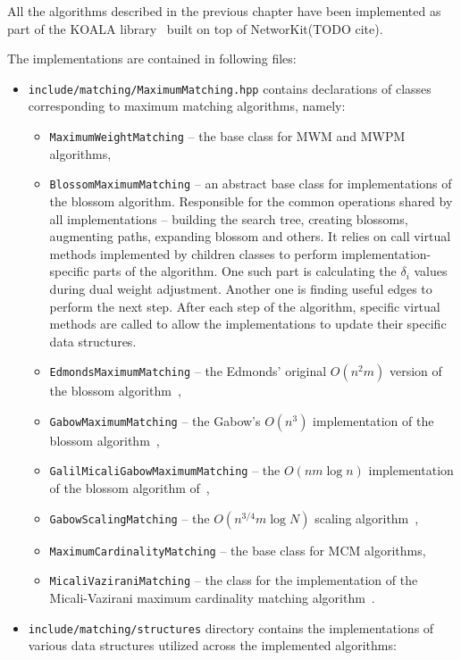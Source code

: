 All the algorithms described in the previous chapter have been implemented as part of the KOALA library~\cite{koala-networkit} built on top of NetworKit(TODO cite). 

The implementations are contained in following files:

\begin{itemize}
    \item \texttt{include/matching/MaximumMatching.hpp} contains declarations of classes corresponding to maximum matching algorithms, namely: \begin{itemize}
        \item \texttt{MaximumWeightMatching} – the base class for \textsc{MWM} and \textsc{MWPM} algorithms,
        \item \texttt{BlossomMaximumMatching} – an abstract base class for implementations of the blossom algorithm. Responsible for the common operations shared by all implementations – building the search tree, creating blossoms, augmenting paths, expanding blossom and others. It relies on call virtual methods implemented by children classes to perform implementation-specific parts of the algorithm. One such part is calculating the $\delta_i$ values during dual weight adjustment. Another one is finding useful edges to perform the next step. After each step of the algorithm, specific virtual methods are called to allow the implementations to update their specific data structures.
        \item \texttt{EdmondsMaximumMatching} – the Edmonds' original $O(n^2m)$ version of the blossom algorithm~\cite{edmonds1965maximum},
        \item \texttt{GabowMaximumMatching} – the Gabow's $O(n^3)$ implementation of the blossom algorithm~\cite{gabow1974implementation},
        \item \texttt{GalilMicaliGabowMaximumMatching} – the $O(nm\log n)$ implementation of the blossom algorithm of~\cite{galil1986ev},
        \item \texttt{GabowScalingMatching} – the $O(n^{3/4}m\log N)$ scaling algorithm~\cite{gabow1984scaling},
        \item \texttt{MaximumCardinalityMatching} – the base class for \textsc{MCM} algorithms,
        \item \texttt{MicaliVaziraniMatching} – the class for the implementation of the Micali-Vazirani maximum cardinality matching algorithm~\cite{micali1980v}.
    \end{itemize}
    \item \texttt{include/matching/structures} directory contains the implementations of various data structures utilized across the implemented algorithms: \begin{itemize}

\end{itemize}
\end{itemize}
